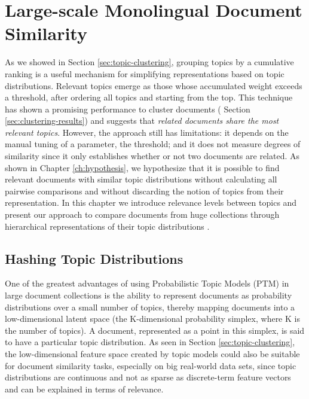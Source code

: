 

\chapter{Large-scale Monolingual Document Similarity}\label{ch:comparisons}

\graphicspath{{comparisons/figures/}}


As we showed in Section \ref{sec:topic-clustering}, grouping topics by a cumulative ranking is a useful mechanism for simplifying representations based on topic distributions. Relevant topics emerge as those whose accumulated weight exceeds a threshold, after ordering all topics and starting from the top. This technique has shown a promising performance to cluster documents ( Section \ref{sec:clustering-results}) and suggests that \textit{related documents share the most relevant topics}. However, the approach still has limitations: it depends on the manual tuning of a parameter, the threshold; and it does not measure degrees of similarity since it only establishes whether or not two documents are related. As shown in Chapter \ref{ch:hypothesis}, we hypothesize that it is possible to find relevant documents with similar topic distributions without calculating all pairwise comparisons and without discarding the notion of topics from their representation. In this chapter we introduce relevance levels between topics and present our approach to compare documents from huge collections through hierarchical representations of their topic distributions \citep{Badenes-Olmedo2019}.

\section{Hashing Topic Distributions}
\label{sec:comparison-hashing}

One of the greatest advantages of using Probabilistic Topic Models (PTM) in large document collections is the ability to represent documents as probability distributions over a small number of topics, thereby mapping documents into a low-dimensional latent space (the K-dimensional probability simplex, where K is the number of topics). A document, represented as a point in this simplex, is said to have a particular topic distribution. As seen in Section \ref{sec:topic-clustering}, the low-dimensional feature space created by topic models could also be suitable for document similarity tasks, especially on big real-world data sets, since topic distributions are continuous and not as sparse as discrete-term feature vectors and can be explained in terms of relevance. 


